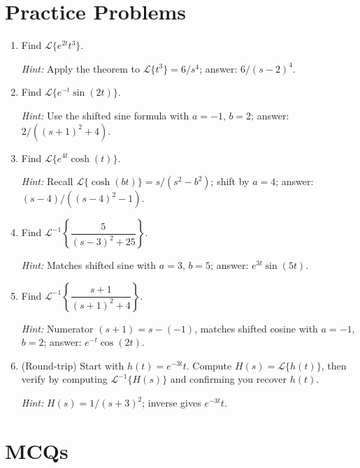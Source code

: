 \documentclass[12pt,a4paper]{article}
\begin{document}
\section{Practice Problems}

\begin{enumerate}[label=\textbf{P\arabic*.}, leftmargin=*, itemsep=0.5em]

\item Find $\mathcal{L}\{e^{2t}t^3\}$.

\textit{Hint:} Apply the theorem to $\mathcal{L}\{t^3\} = 6/s^4$; answer: $6/(s-2)^4$.

\item Find $\mathcal{L}\{e^{-t}\sin(2t)\}$.

\textit{Hint:} Use the shifted sine formula with $a = -1$, $b = 2$; answer: $2/((s+1)^2+4)$.

\item Find $\mathcal{L}\{e^{4t}\cosh(t)\}$.

\textit{Hint:} Recall $\mathcal{L}\{\cosh(bt)\} = s/(s^2-b^2)$; shift by $a=4$; answer: $(s-4)/((s-4)^2-1)$.

\item Find $\mathcal{L}^{-1}\!\left\{\dfrac{5}{(s-3)^2+25}\right\}$.

\textit{Hint:} Matches shifted sine with $a=3$, $b=5$; answer: $e^{3t}\sin(5t)$.

\item Find $\mathcal{L}^{-1}\!\left\{\dfrac{s+1}{(s+1)^2+4}\right\}$.

\textit{Hint:} Numerator $(s+1) = s - (-1)$, matches shifted cosine with $a=-1$, $b=2$; answer: $e^{-t}\cos(2t)$.

\item (Round-trip) Start with $h(t) = e^{-3t}t$.
Compute $H(s) = \mathcal{L}\{h(t)\}$, then verify by computing $\mathcal{L}^{-1}\{H(s)\}$ and
confirming you recover $h(t)$.

\textit{Hint:} $H(s) = 1/(s+3)^2$; inverse gives $e^{-3t}t$.

\end{enumerate}

\section{MCQs}
\end{document}
